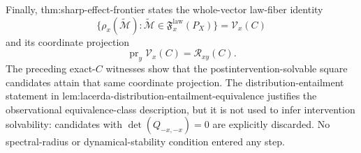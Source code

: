 Finally, \textnormal{thm:sharp-effect-frontier} states the whole-vector law-fiber
identity
\[
 \{\rho_x(\widetilde{\mathcal M}):
   \widetilde{\mathcal M}\in\mathfrak F_x^{\mathrm{law}}(P_X)\}
 =\mathcal V_x(C)
\]
and its coordinate projection
\[
 \operatorname{pr}_y\mathcal V_x(C)=\mathcal R_{xy}(C).
\]
The preceding exact-\(C\) witnesses show that the postintervention-solvable
square candidates attain
that same coordinate projection.  The distribution-entailment statement in
\textnormal{lem:lacerda-distribution-entailment-equivalence} justifies the
observational equivalence-class description, but it is not used to infer
intervention solvability: candidates with \(\det(Q_{-x,-x})=0\) are explicitly
discarded.  No spectral-radius or dynamical-stability condition entered any
step.